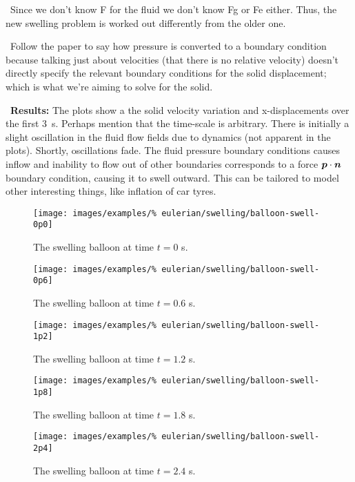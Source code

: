 \textbullet\ Since we don't know F for the fluid we don't know Fg or
Fe either. Thus, the new swelling problem is worked out differently
from the older one.

\textbullet\ Follow the paper to say how pressure is converted to a
boundary condition because talking just about velocities (that there
is no relative velocity) doesn't directly specify the relevant
boundary conditions for the solid displacement; which is what we're
aiming to solve for the solid.

\textbullet\ {\bf Results:} The plots show a the solid velocity
variation and x-displacements over the first 3~s. Perhaps mention that
the time-scale is arbitrary. There is initially a slight oscillation
in the fluid flow fields due to dynamics (not apparent in the
plots). Shortly, oscillations fade. The fluid pressure boundary
conditions causes inflow and inability to flow out of other boundaries
corresponds to a force $\mbox{\boldmath$ p$}\cdot\mbox{\boldmath$ n$}$ boundary condition, causing it to
swell outward. This can be tailored to model other interesting things,
like inflation of car tyres.

\begin{figure}[!hptb]
\centering
\texttt{[image: images/examples/\%
eulerian/swelling/balloon-swell-0p0]}
\caption{The swelling balloon at time $t=0$ s.} 
\label{swelling-balloon-image-0p0}
\end{figure}

\begin{figure}[!hptb]
\centering
\texttt{[image: images/examples/\%
eulerian/swelling/balloon-swell-0p6]}
\caption{The swelling balloon at time $t=0.6$ s.} 
\label{swelling-balloon-image-0p6}
\end{figure}

\begin{figure}[!hptb]
\centering
\texttt{[image: images/examples/\%
eulerian/swelling/balloon-swell-1p2]}
\caption{The swelling balloon at time $t=1.2$ s.} 
\label{swelling-balloon-image-1p2}
\end{figure}

\begin{figure}[!hptb]
\centering
\texttt{[image: images/examples/\%
eulerian/swelling/balloon-swell-1p8]}
\caption{The swelling balloon at time $t=1.8$ s.} 
\label{swelling-balloon-image-1p8}
\end{figure}

\begin{figure}[!hptb]
\centering
\texttt{[image: images/examples/\%
eulerian/swelling/balloon-swell-2p4]}
\caption{The swelling balloon at time $t=2.4$ s.} 
\label{swelling-balloon-image-2p4}
\end{figure}

